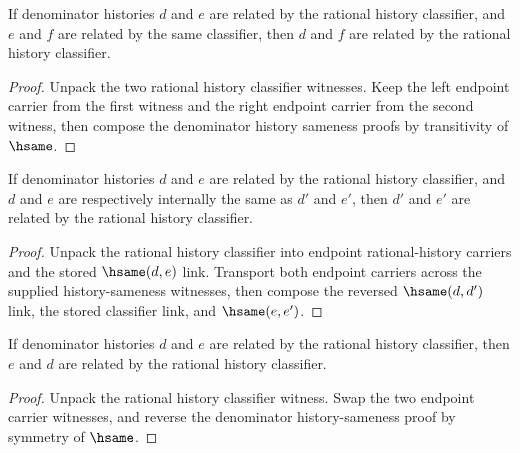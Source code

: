 \begin{theorem}
\label{thm:rat-history-classifier-trans}
If denominator histories $d$ and $e$ are related by the rational history
classifier, and $e$ and $f$ are related by the same classifier, then $d$ and
$f$ are related by the rational history classifier.
\end{theorem}
\begin{proof}
Unpack the two rational history classifier witnesses. Keep the left endpoint
carrier from the first witness and the right endpoint carrier from the second
witness, then compose the denominator history sameness proofs by transitivity
of $\hsame$.
\end{proof}

\begin{theorem}
\label{thm:rat-history-classifier-hsame-transport}
If denominator histories \(d\) and \(e\) are related by the rational history
classifier, and \(d\) and \(e\) are respectively internally the same as
\(d'\) and \(e'\), then \(d'\) and \(e'\) are related by the rational history
classifier.
\end{theorem}
\begin{proof}
Unpack the rational history classifier into endpoint rational-history carriers
and the stored \(\hsame(d,e)\) link. Transport both endpoint carriers across
the supplied history-sameness witnesses, then compose the reversed
\(\hsame(d,d')\) link, the stored classifier link, and \(\hsame(e,e')\).
\end{proof}

\begin{theorem}
\label{thm:rat-history-classifier-symmetry}
If denominator histories \(d\) and \(e\) are related by the rational history
classifier, then \(e\) and \(d\) are related by the rational history classifier.
\end{theorem}
\begin{proof}
Unpack the rational history classifier witness. Swap the two endpoint carrier
witnesses, and reverse the denominator history-sameness proof by symmetry of
\(\hsame\).
\end{proof}

